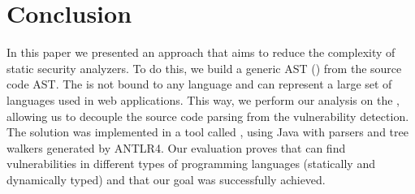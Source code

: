 \section{Conclusion}
In this paper we presented an approach that aims to reduce the complexity of static security analyzers. To do this, we build a generic AST (\astname{}) from the source code AST. The \astname{} is not bound to any language and can represent a large set of languages used in web applications. This way, we perform our analysis on the \astname{}, allowing us to decouple the source code parsing from the vulnerability detection. The solution was implemented in a tool called \toolname{}, using Java with parsers and tree walkers generated by ANTLR4. Our evaluation proves that \toolname{} can find vulnerabilities in different types of programming languages (statically and dynamically typed) and that our goal was successfully achieved.